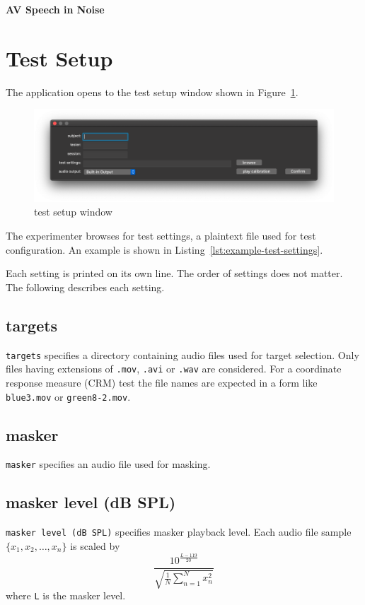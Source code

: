 \documentclass[11pt,pdftex,letterpaper]{article}
\begin{document}
\vspace*{30ex}
\begin{center}
\textbf{AV Speech in Noise}
\end{center}
\pagebreak
\tableofcontents
\pagebreak

\section{Test Setup}
The application opens to the test setup window shown in Figure~\ref{fig:test-setup-window}.
\begin{figure}
	\centering
	\includegraphics[width = 0.9\linewidth]{test-setup-window.png}
	\caption{test setup window}
	\label{fig:test-setup-window}
\end{figure}
The experimenter browses for test settings, a plaintext file used for test configuration. An example is shown in Listing~\ref{lst:example-test-settings}.

\noindent\begin{minipage}{\textwidth}
	
\end{minipage}
Each setting is printed on its own line. The order of settings does not matter. The following describes each setting.
\subsection{targets}
\texttt{targets} specifies a directory containing audio files used for target selection. Only files having extensions of \texttt{.mov}, \texttt{.avi} or \texttt{.wav} are considered. For a coordinate response measure (CRM) test the file names are expected in a form like \texttt{blue3.mov} or \texttt{green8-2.mov}.
\subsection{masker}
\texttt{masker} specifies an audio file used for masking.
\subsection{masker level (dB SPL)}
\texttt{masker level (dB SPL)} specifies masker playback level. Each audio file sample ${\displaystyle \{x_{1}, x_{2}, \dots , x_{n}\}}$ is scaled by
\begin{equation}
 \frac{10^{\frac{L-119}{20}}}{\sqrt{\frac{1}{N}\sum_{n=1}^{N}x_{n}^{2}}}\label{eq:masker-scale}
\end{equation}
where \texttt{L} is the masker level.
\end{document}
